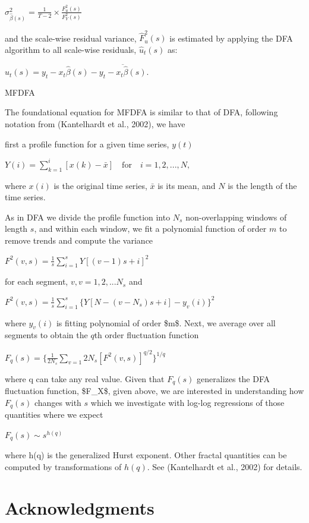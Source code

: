 \documentclass[
  man]{apa6}
\begin{document}
\(\sigma_{\widehat{\beta}(s)}^2 = \frac{1}{T-2} \times \frac{F^2_u(s)}{F^2_Y(s)}\)

and the scale-wise residual variance, \(\widehat{F}^2_u(s)\) is estimated
by applying the DFA algorithm to all scale-wise residuals,
\(\widehat{u}_t(s)\) as:

\(\widehat{u}_t(s) = y_t - x_t\widehat{\beta}(s) - \overline{y_t - x_t\widehat{\beta}(s)}\).

MFDFA

The foundational equation for MFDFA is similar to that of DFA, following
notation from (Kantelhardt et al., 2002), we
have

first a profile function for a given time series, \(y(t)\)

\(Y(i) = \sum_{k=1}^i [x(k) - \bar{x}] \quad \textrm{for} \quad i = 1, 2, ..., N,\)

where \(x(i)\) is the original time series, \(\bar{x}\) is its mean, and \(N\)
is the length of the time series.

As in DFA we divide the profile function into \(N_s\) non-overlapping
windows of length \(s\), and within each window, we fit a polynomial
function of order \(m\) to remove trends and compute the variance

\(F^2(v,s)=\frac{1}{s}\sum_{i=1}^{s}{Y[(v-1)s+i]}^2\)

for each segment, \(v, v=1,2,...N_s\) and

\(F^2(v,s)=\frac{1}{s}\sum_{i=1}^{s}\{Y[N-(v-N_s)s+i]-y_v(i)\}^2\)

where \(y_v(i)\) is fitting polynomial of order \$m\$. Next, we average
over all segments to obtain the \(q\)th order fluctuation function

\(F_q(s)=\{\frac{1}{2N_s}\sum_{v=1}{2N_s}[F^2(v,s)]^{q/2}\}^{1/q}\)

where q can take any real value. Given that \(F_q(s)\) generalizes the DFA
fluctuation function, \$F\_X\$, given above, we are interested in
understanding how \(F_q(s)\) changes with \(s\) which we investigate with
log-log regressions of those quantities where we expect

\(F_q(s)\sim s^{h(q)}\)

where h(q) is the generalized Hurst exponent. Other fractal quantities
can be computed by transformations of \(h(q)\). See
(Kantelhardt et al., 2002) for details.

\hypertarget{acknowledgments}{%
\section{Acknowledgments}\label{acknowledgments}}
\end{document}
